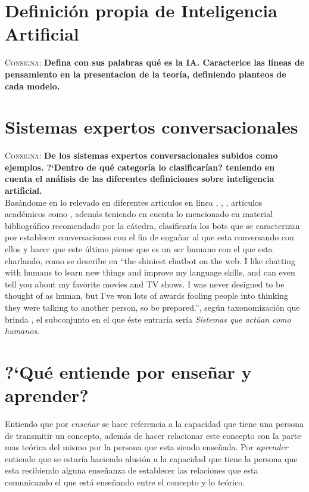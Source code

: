\documentclass{article}
\begin{document}
\section{Definici\'on propia de Inteligencia Artificial}
\textsc{Consigna}: \textbf{Defina con sus palabras qu\'e es la IA. Caracterice las l\'ineas de pensamiento en la presentacion de la teor\'ia, definiendo planteos de cada modelo.}

\section{Sistemas expertos conversacionales}
\textsc{Consigna}: \textbf{De los sistemas expertos conversacionales subidos como ejemplos. ?`Dentro de qu\'e categor\'ia lo clasificar\'ian? teniendo en cuenta el an\'alisis de las diferentes definiciones sobre inteligencia artificial.}\\

Bas\'andome en lo relevado en diferentes articulos en l\'inea \cite{loebner1}, \cite{loebner2}, \cite{loebner3}, art\'iculos acad\'emicos como \cite{gonzalez2007}, adem\'as teniendo en cuenta lo mencionado en material bibliogr\'afico recomendado por la c\'atedra, clasificar\'ia los bots que se caracterizan por establecer conversaciones con el fin de enga\~nar al que esta conversando con ellos y hacer que este \'ultimo piense que es un ser humano con el que esta charlando, como se describe en \cite{elbot} ``the shiniest chatbot on the web. I like chatting with humans to learn new things and improve my language skills, and can even tell you about my favorite movies and TV shows. I was never designed to be thought of as human, but I’ve won lots of awards fooling people into thinking they were talking to another person, so be prepared.'', seg\'un taxonomizaci\'on que brinda \cite{russel}, el subconjunto en el que \'este entrar\'ia ser\'ia \textit{Sistemas que act\'uan como humanos}.

\section{?`Qu\'e entiende por ense\~nar y aprender?}
Entiendo que por \textit{ense\~nar} se hace referencia a la capacidad que tiene una persona de transmitir un concepto, adem\'as de hacer relacionar este concepto con la parte mas te\'orica del mismo por la persona que esta siendo ense\~nada.
Por \textit{aprender} entiendo que se estar\'ia haciendo alusi\'on a la capacidad que tiene la persona que esta recibiendo alguna ense\~nanza de establecer las relaciones que esta comunicando el que est\'a ense\~nando entre el concepto y lo te\'orico.
\end{document}
